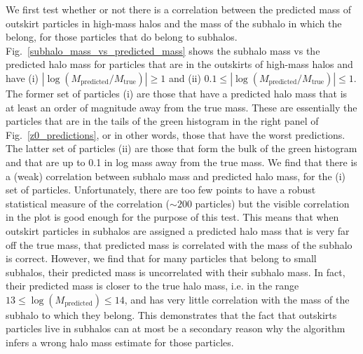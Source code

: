 \documentclass[11pt]{article}
\begin{document}
We first test whether or not there is a correlation between the predicted mass of outskirt particles in high-mass halos and the mass of the subhalo in which the belong, for those particles that do belong to subhalos. Fig.~\ref{subhalo_mass_vs_predicted_mass} shows the subhalo mass vs the predicted halo mass for particles that are in the outskirts of high-mass halos and have (i)  $| \log(M_\mathrm{predicted}/M_\mathrm{true}) | \geq 1$ and (ii) $0.1 \leq | \log(M_\mathrm{predicted}/M_\mathrm{true}) | \leq 1$. The former set of particles (i) are those that have a predicted halo mass that is at least an order of magnitude away from the true mass. These are essentially the particles that are in the tails of the green histogram in the right panel of Fig.~\ref{z0_predictions}, or in other words, those that have the worst predictions. The latter set of particles (ii) are those that form the bulk of the green histogram and that are up to 0.1 in log mass away from the true mass. We find that there is a (weak) correlation between subhalo mass and predicted halo mass, for the (i) set of particles. Unfortunately, there are too few points to have a robust statistical measure of the correlation ($\sim 200$ particles) but the visible correlation in the plot is good enough for the purpose of this test. This means that when outskirt particles in subhalos are assigned a predicted halo mass that is very far off the true mass, that predicted mass is correlated with the mass of the subhalo is correct. However, we find that for many particles that belong to small subhalos, their predicted mass is uncorrelated with their subhalo mass. In fact, their predicted mass is closer to the true halo mass, i.e. in the range $13 \leq \log(M_\mathrm{predicted}) \leq 14$, and has very little correlation with the mass of the subhalo to which they belong. This demonstrates that the fact that outskirts particles live in subhalos can at most be a secondary reason why the algorithm infers a wrong halo mass estimate for those particles.
\end{document}
